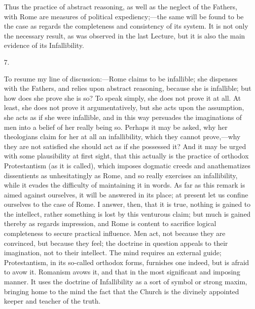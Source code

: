 Thus the practice of abstract reasoning, as well as the neglect of
the Fathers, with Rome are measures of political expediency;—the
same will be found to be the case as regards the completeness and
consistency of its system. It is not only the necessary result, as was
observed in the last Lecture, but it is also the main evidence of its
Infallibility.

7.

To resume my line of discussion:—Rome claims to be infallible;
she dispenses with the Fathers, and relies upon abstract reasoning,
because she is infallible; but how does she prove she is so? To speak
simply, she does not prove it at all. At least, she does not prove it
argumentatively, but she acts upon the assumption, she acts as if she
were infallible, and in this way persuades the imaginations of
men into a belief of her really being so. Perhaps it may be asked, why
her theologians claim for her at all an infallibility, which they
cannot prove,—why they are not satisfied she should act as if she
possessed it? And it may be urged with some plausibility at first
sight, that this actually is the practice of orthodox Protestantism
(as it is called), which imposes dogmatic creeds and anathematizes
dissentients as unhesitatingly as Rome, and so really exercises an
infallibility, while it evades the difficulty of maintaining it in
words. As far as this remark is aimed against ourselves, it will be
answered in its place; at present let us confine ourselves to the case
of Rome. I answer, then, that it is true, nothing is gained to the
intellect, rather something is lost by this venturous claim; but much
is gained thereby as regards impression, and Rome is content to
sacrifice logical completeness to secure practical influence. Men act,
not because they are convinced, but because they feel; the doctrine in
question appeals to their imagination, not to their intellect. The
mind requires an external guide; Protestantism, in its so-called
orthodox forms, furnishes one indeed, but is afraid to avow it.
Romanism avows it, and that in the most significant and imposing
manner. It uses the doctrine of Infallibility as a sort of symbol or
strong maxim, bringing home to the mind the fact that the Church is
the divinely appointed keeper and teacher of the truth.

